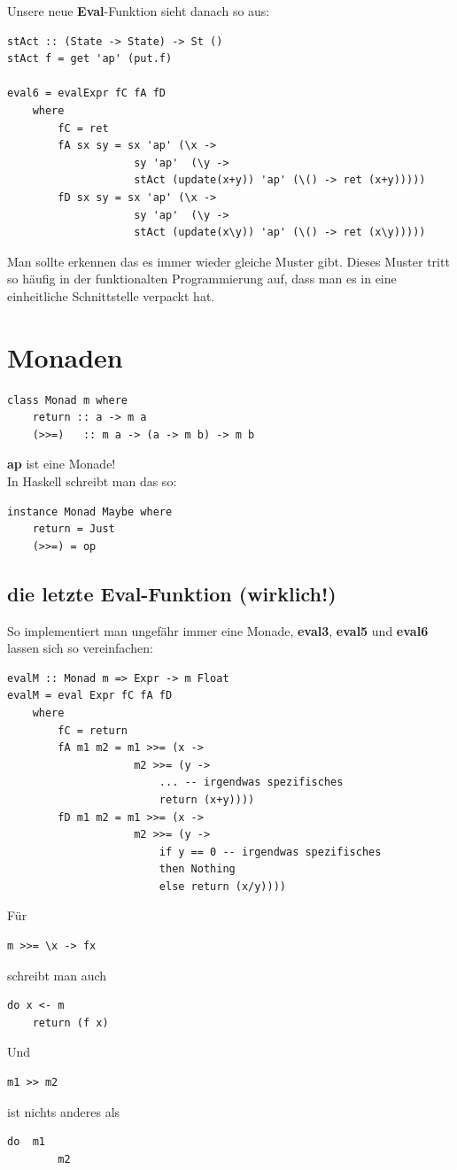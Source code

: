 \documentclass[ngerman,a4paper]{report}
\begin{document}
Unsere neue \textbf{Eval}-Funktion sieht danach so aus:

\begin{lstlisting}
stAct :: (State -> State) -> St ()
stAct f = get 'ap' (put.f)

eval6 = evalExpr fC fA fD
	where
		fC = ret
		fA sx sy = sx 'ap' (\x ->
					sy 'ap'	 (\y -> 
					stAct (update(x+y)) 'ap' (\() -> ret (x+y)))))
		fD sx sy = sx 'ap' (\x ->
					sy 'ap'	 (\y -> 
					stAct (update(x\y)) 'ap' (\() -> ret (x\y)))))
\end{lstlisting}

Man sollte erkennen das es immer wieder gleiche Muster gibt. Dieses Muster tritt so häufig in der funktionalten Programmierung auf, dass man es in eine einheitliche Schnittstelle verpackt hat.
\section{Monaden}
\begin{lstlisting}
class Monad m where
	return :: a -> m a
	(>>=)	:: m a -> (a -> m b) -> m b
\end{lstlisting}
\textbf{ap} ist eine Monade!\\
In Haskell schreibt man das so:
\begin{lstlisting}
instance Monad Maybe where
	return = Just
	(>>=) = op
\end{lstlisting}

\subsection{die letzte Eval-Funktion (wirklich!)}
So implementiert man ungefähr immer eine Monade, \textbf{eval3}, \textbf{eval5} und \textbf{eval6} lassen sich so vereinfachen:
\begin{lstlisting}
evalM :: Monad m => Expr -> m Float
evalM = eval Expr fC fA fD
	where
		fC = return
		fA m1 m2 = m1 >>= (x -> 
					m2 >>= (y ->
						... -- irgendwas spezifisches
						return (x+y))))
		fD m1 m2 = m1 >>= (x -> 
					m2 >>= (y ->
						if y == 0 -- irgendwas spezifisches
						then Nothing
						else return (x/y))))
\end{lstlisting}
Für
\begin{lstlisting}
m >>= \x -> fx
\end{lstlisting}
schreibt man auch
\begin{lstlisting}
do x <- m
	return (f x)
\end{lstlisting}

Und
\begin{lstlisting}
m1 >> m2
\end{lstlisting}
ist nichts anderes als
\begin{lstlisting}
do	m1
		m2
\end{lstlisting}
\end{document}
